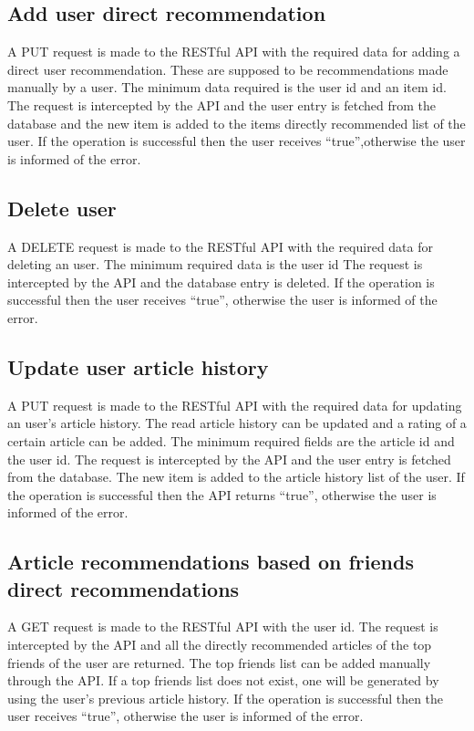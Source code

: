 \subsection{Add user direct recommendation}
\label{sec:workflow-add-user-direct-recommendation}
A PUT request is made to the RESTful API with the required data for adding a direct user recommendation.
These are supposed to be recommendations made manually by a user.
The minimum data required is the user id and an item id.
The request is intercepted by the API and the user entry is fetched from the database and the new item is added to the items directly recommended list of the user. If the operation is successful then the user receives “true”,otherwise the user is informed of the error. 

\subsection{Delete user}
\label{sec:workflow-delete-user}
A DELETE request is made to the RESTful API with the required data for deleting an user.
The minimum required data is the user id
The request is intercepted by the API and the database entry is deleted. If the operation is successful then the user receives “true”, otherwise the user is informed of the error. 

\subsection{Update user article history}
\label{sec:workflow-update-user-article-history}
A PUT request is made to the RESTful API with the required data for updating an user's article history.
The read article history can be updated and a rating of a certain article can be added. 
The minimum required fields are the article id and the user id.
The request is intercepted by the API and the user entry is fetched from the database. The new item is added to the article history list of the user. If the operation is successful then the API returns “true”, otherwise the user is informed of the error. 

\subsection{Article recommendations based on friends direct recommendations}
\label{sec:workflow-friends-direct-recommendations}
A GET request is made to the RESTful API with the user id.
The request is intercepted by the API and all the directly recommended articles of the top friends of the user are returned.
The top friends list can be added manually through the API.
If a top friends list does not exist, one will be generated by using the user’s previous article history.
If the operation is successful then the user receives “true”, otherwise the user is informed of the error. 

